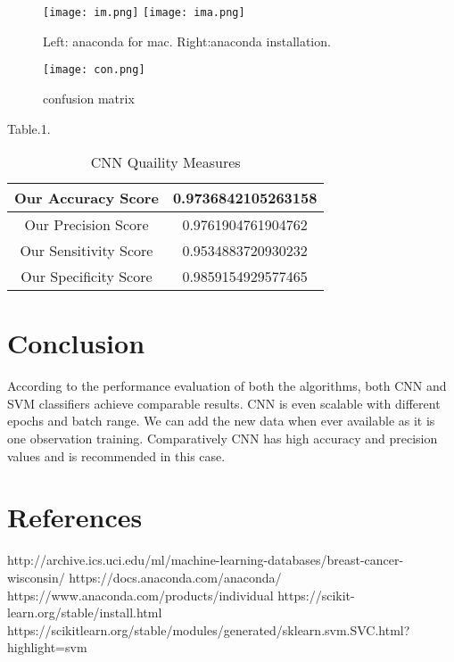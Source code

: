 \documentclass[conference]{IEEEtran}
\begin{document}
\begin{figure}[h]
\texttt{[image: im.png]}\hfill
\texttt{[image: ima.png]}\hfill
\caption{Left: anaconda for mac. Right:anaconda installation.}
\end{figure}


\begin{figure}[h!]
    \centerline{\texttt{[image: con.png]}}
    \caption{confusion matrix}
\end{figure}

Table.1.\\
\begin{table}[h]
\centering
\begin{tabular}{ | c | c | }
 \hline
 Our Accuracy Score  & 0.9736842105263158 \\
 \hline
 Our Precision Score  & 0.9761904761904762 \\
 \hline
 Our Sensitivity Score & 0.9534883720930232 \\
 \hline
 Our Specificity Score & 0.9859154929577465 \\
 \hline
\end{tabular}
\caption{CNN Quaility Measures}
\end{table}
\section{Conclusion}
According to the performance evaluation of both the algorithms, both CNN and SVM classifiers achieve comparable results. CNN is even scalable with different epochs and batch range. We can add the new data when ever available as it is one observation training. Comparatively CNN has high accuracy and precision values and is recommended in this case.

\section{References}
\begin{thebibliography}{00}
 http://archive.ics.uci.edu/ml/machine-learning-databases/breast-cancer-wisconsin/ 
 https://docs.anaconda.com/anaconda/
 https://www.anaconda.com/products/individual
 https://scikit-learn.org/stable/install.html
https://scikitlearn.org/stable/modules/generated/sklearn.svm.SVC.html?highlight=svm

\end{thebibliography}
\vspace{12pt}
\end{document}
